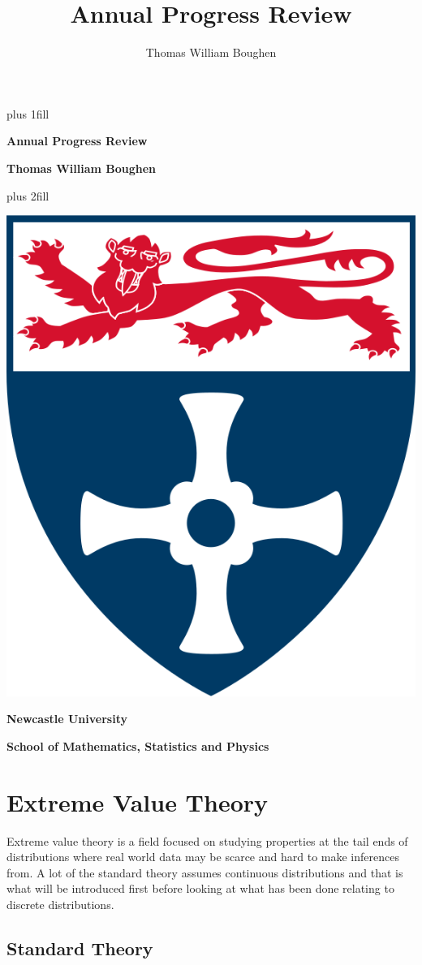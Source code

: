 \documentclass[
  10pt,
  a4paper,
]{scrreprt}
\title{Annual Progress Review}
\author{Thomas William Boughen}
\date{}
\theoremstyle{definition}
\theoremstyle{remark}
\begin{document}
\cleardoublepage
\thispagestyle{empty}
{\centering
\hbox{}\vskip 0cm plus 1fill
{\Huge\bfseries Annual Progress Review \par}
\vspace{12ex}
{\Large\bfseries Thomas William Boughen \par}
\vspace{3ex}
\vskip 0cm plus 2fill
\vspace{3ex}
{\bfseries\large  \par}
\vspace{12ex}
{\includegraphics[width=0.1\linewidth]{"imgs/University_of_Newcastle_Coat_of_Arms.png"}\par}
%
%
{\bfseries\large Newcastle University \par}
\vspace{3ex}
%
{\bfseries\large School of Mathematics, Statistics and Physics \par}
%
\vspace{12ex}
\justifying
\noindent\ifdefined\Shaded\renewenvironment{Shaded}{\begin{tcolorbox}[interior hidden, breakable, enhanced, borderline west={3pt}{0pt}{shadecolor}, boxrule=0pt, frame hidden, sharp corners]}{\end{tcolorbox}}\fi

\hypertarget{extreme-value-theory}{%
\chapter{Extreme Value Theory}\label{extreme-value-theory}}

Extreme value theory is a field focused on studying properties at the
tail ends of distributions where real world data may be scarce and hard
to make inferences from. A lot of the standard theory assumes continuous
distributions and that is what will be introduced first before looking
at what has been done relating to discrete distributions.

\hypertarget{standard-theory}{%
\section{Standard Theory}\label{standard-theory}}

}
\end{document}

